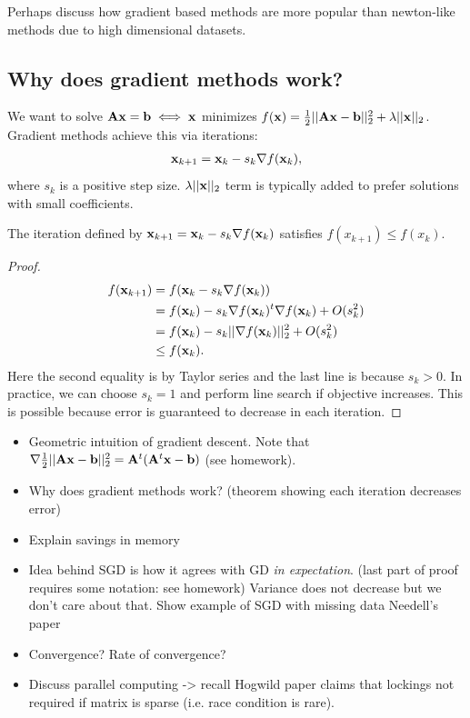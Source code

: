 \documentclass[./some_latex_template.tex]{subfiles}
\begin{document}
Perhaps discuss how gradient based methods are more popular than newton-like methods due to high dimensional datasets. 

\subsection{Why does gradient methods work?}

We want to solve $\mathbf{A}\mathbf{x} = \mathbf{b} \iff \mathbf{x}$ minimizes $f(\mathbf{x}) = \frac{1}{2}||\mathbf{A}\mathbf{x} - \mathbf{b}||^2_2 + \lambda||\mathbf{x}||_2$. Gradient methods achieve this via iterations:
\begin{align}\label{gradient_method_works}
	\mathbf{x}_{k + 1} = \mathbf{x}_k - s_k \nabla f(\mathbf{x}_k),
\end{align}
where $s_k$ is a positive step size. $\lambda ||\mathbf{x}||_2$ term is typically added to prefer solutions with small coefficients. 

\begin{theorembox}{}{}
The iteration defined by $\mathbf{x}_{k + 1} = \mathbf{x}_k - s_k \nabla f(\mathbf{x}_k)$ satisfies $f(x_{k + 1}) \le f(x_k)$. 
\end{theorembox}
\begin{proof}
	\begin{align*}
		f(\mathbf{x}_{k + 1}) 
		&= f(\mathbf{x}_k - s_k\nabla f(\mathbf{x}_k)) \\
		&= f(\mathbf{x}_k) - s_k\nabla f(\mathbf{x}_k)^t\nabla f(\mathbf{x}_k) + O(s_k^2)\\
		&= f(\mathbf{x}_k) - s_k ||\nabla f(\mathbf{x}_k)||_2^2 + O(s_k^2)\\
		&\le f(\mathbf{x}_k).
	\end{align*}
Here the second equality is by Taylor series and the last line is because $s_k > 0$. In practice, we can choose $s_k = 1$ and perform line search if objective increases. This is possible because error is guaranteed to decrease in each iteration.  

\end{proof}

\begin{itemize}
	\item Geometric intuition of gradient descent. Note that $\nabla \frac{1}{2}||\mathbf{A}\mathbf{x} - \mathbf{b}||_2^2 = \mathbf{A}^t(\mathbf{A}^t\mathbf{x} - \mathbf{b})$ (see homework).
	\item Why does gradient methods work? (theorem showing each iteration decreases error)
	\item Explain savings in memory
	\item Idea behind SGD is how it agrees with GD \textit{in expectation}. (last part of proof requires some notation: see homework) Variance does not decrease but we don't care about that. Show example of SGD with missing data Needell's paper
	\item Convergence? Rate of convergence?
	\item Discuss parallel computing -> recall Hogwild paper claims that lockings not required if matrix is sparse (i.e. race condition is rare). 
\end{itemize}
\end{document}
